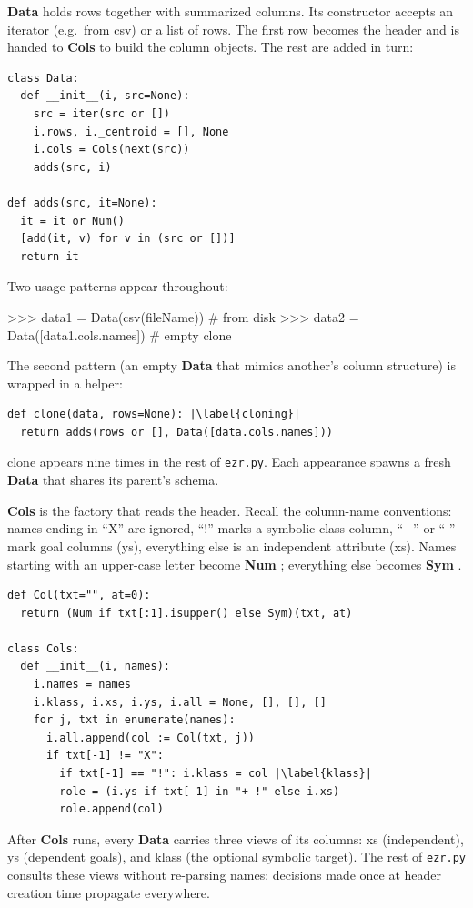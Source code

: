 \documentclass[AMA,STIX2COL]{WileyNJDv5}
\newcommand{\cls}[1]{%
  \setlength{\fboxsep}{1.5pt}%
  \colorbox{clsbg}{\sffamily\bfseries{#1}}%
}
\begin{document}
\cls{Data} holds rows together with summarized columns. Its
constructor accepts an iterator (e.g.\ from \textsf{csv}) or a
list of rows. The first row becomes the header and is handed
to \cls{Cols} to build the column objects. The rest are added
in turn:
\begin{lstlisting}
class Data:
  def __init__(i, src=None):
    src = iter(src or [])
    i.rows, i._centroid = [], None
    i.cols = Cols(next(src))
    adds(src, i)

def adds(src, it=None):
  it = it or Num()
  [add(it, v) for v in (src or [])]
  return it
\end{lstlisting}
Two usage patterns appear throughout:
\begin{repl}
>>> data1 = Data(csv(fileName))           # from disk
>>> data2 = Data([data1.cols.names])      # empty clone
\end{repl}
The second pattern (an empty \cls{Data} that mimics another's
column structure) is wrapped in a helper:
\begin{lstlisting}
def clone(data, rows=None): |\label{cloning}|
  return adds(rows or [], Data([data.cols.names]))
\end{lstlisting}
\textsf{clone} appears nine times in the rest of
\texttt{ezr.py}. Each appearance spawns a fresh \cls{Data} that
shares its parent's schema.

\cls{Cols} is the factory that reads the header. Recall the
column-name conventions: names ending in ``X'' are ignored, ``!''
marks a symbolic class column, ``+'' or ``-'' mark goal columns
(\textsf{ys}), everything else is an independent attribute
(\textsf{xs}). Names starting with an upper-case letter become
\cls{Num}; everything else becomes \cls{Sym}.
\begin{lstlisting}
def Col(txt="", at=0):
  return (Num if txt[:1].isupper() else Sym)(txt, at)

class Cols:
  def __init__(i, names):
    i.names = names
    i.klass, i.xs, i.ys, i.all = None, [], [], []
    for j, txt in enumerate(names):
      i.all.append(col := Col(txt, j))
      if txt[-1] != "X":
        if txt[-1] == "!": i.klass = col |\label{klass}|
        role = (i.ys if txt[-1] in "+-!" else i.xs)
        role.append(col)
\end{lstlisting}
After \cls{Cols} runs, every \cls{Data} carries three views of
its columns: \textsf{xs} (independent), \textsf{ys} (dependent
goals), and \textsf{klass} (the optional symbolic target). The
rest of \texttt{ezr.py} consults these views without re-parsing
names: decisions made once at header creation time propagate
everywhere.
\end{document}
